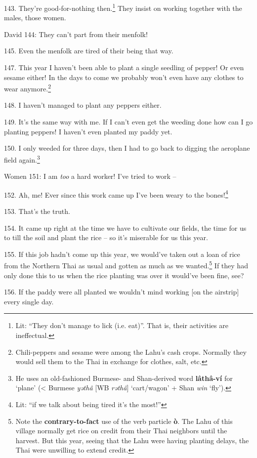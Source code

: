 143. They're good-for-nothing then.\footnote{Lit: ``They don't manage to lick (i.e. eat)''. That is, their activities are ineffectual.} They insist on working together with the
males, those women.

David 144: They can't part from their menfolk!

145. Even the menfolk are tired of their being that way.

147. This year I haven't been able to plant a single seedling of pepper! Or even
sesame either! In the days to come we probably won't even have any clothes to wear
anymore.\footnote{Chili-peppers and sesame were among the Lahu's cash crops. Normally they would sell them to the Thai in exchange for clothes, salt, etc.}

148. I haven't managed to plant any peppers either.

149. It's the same way with me. If I can't even get the weeding done how can I
go planting peppers! I haven't even planted my paddy yet.

150. I only weeded for three days, then I had to go back to digging the aeroplane
field again.\footnote{He uses an old-fashioned Burmese- and Shan-derived word \textbf{lâthâ-ví} for `plane' (< Burmese \textit{yəthâ} [WB \textit{rəthâ}] `cart/wagon' + Shan \textit{win} `fly').}

Women 151: I am \textit{too} a hard worker! I've tried to work --

152. Ah, me! Ever since this work came up I've been weary to the bones!\footnote{Lit: ``if we talk about being tired it's the most!''}

153. That's the truth.

154. It came up right at the time we have to cultivate our fields, the time for
us to till the soil and plant the rice -- so it's miserable for us this year.

155. If this job hadn't come up this year, we would've taken out a loan of rice
from the Northern Thai as usual and gotten as much as we wanted.\footnote{Note the \textbf{contrary-to-fact} use of the verb particle \textbf{ò}. The Lahu of this village normally get rice on credit from their Thai neighbors until the harvest. But this year, seeing that the Lahu were having planting delays, the Thai were unwilling to extend credit.} If they had
only done this to us when the rice planting was over it would've been fine, see?

156. If the paddy were all planted we wouldn't mind working [on the airstrip] every
single day.

